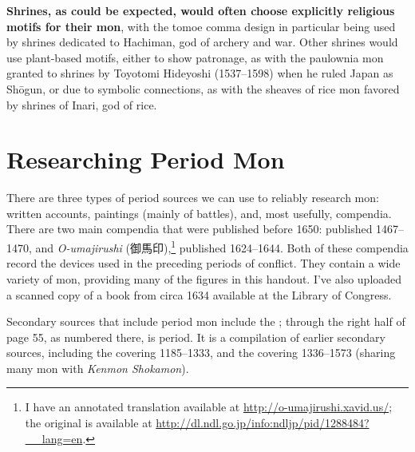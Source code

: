 \documentclass{article}
\begin{document}
  \textbf{Shrines, as could be expected, would often choose explicitly
  religious motifs for their mon}, with the tomoe comma design in
  particular being used by shrines dedicated to Hachiman, god of
  archery and war.  Other shrines would use plant-based motifs, either
  to show patronage, as with the paulownia mon granted to shrines by
  Toyotomi Hideyoshi (1537--1598) when he ruled Japan as Sh\=ogun, or
  due to symbolic connections, as with the sheaves of rice mon favored
  by shrines of Inari, god of rice.

\section{Researching Period Mon}

  There are three types of period sources we can use to reliably research
  mon: written accounts, paintings (mainly of battles), and, most
  usefully, compendia.
  There are two main compendia that were published before 1650:
   published 1467--1470, and 
  \emph{O-umajirushi} (御馬印),\footnote{I have an annotated
  translation available at \url{http://o-umajirushi.xavid.us/}; the original
  is available at \url{http://dl.ndl.go.jp/info:ndljp/pid/1288484?__lang=en}.} published 1624--1644.  Both of these compendia
  record the devices used in the preceding periods of conflict. They contain
  a wide variety of mon, providing many of the figures in this handout.
  I've also uploaded a scanned copy of  a book from circa 1634 available
  at the Library of Congress.

  Secondary sources that include period mon include the
  ;
  through the right half of page 55, as numbered there, is period. It is a
  compilation of earlier secondary sources, including the
   covering 1185--1333, and the  covering 1336--1573 (sharing many mon with \emph{Kenmon
    Shokamon}).
\end{document}
